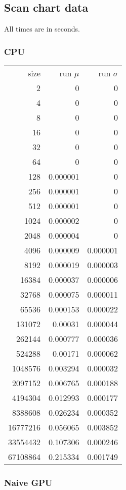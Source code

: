 \subsection{Scan chart data}
\label{sec:scan_chart_data}

All times are in seconds.

\subsubsection{CPU}

\begin{tabular}{r r r}
size & run $\mu$ & run $\sigma$ \\
2 & 0 & 0 \\
4 & 0 & 0 \\
8 & 0 & 0 \\
16 & 0 & 0 \\
32 & 0 & 0 \\
64 & 0 & 0 \\
128 & 0.000001 & 0 \\
256 & 0.000001 & 0 \\
512 & 0.000001 & 0 \\
1024 & 0.000002 & 0 \\
2048 & 0.000004 & 0 \\
4096 & 0.000009 & 0.000001 \\
8192 & 0.000019 & 0.000003 \\
16384 & 0.000037 & 0.000006 \\
32768 & 0.000075 & 0.000011 \\
65536 & 0.000153 & 0.000022 \\
131072 & 0.00031 & 0.000044 \\
262144 & 0.000777 & 0.000036 \\
524288 & 0.00171 & 0.000062 \\
1048576 & 0.003294 & 0.000032 \\
2097152 & 0.006765 & 0.000188 \\
4194304 & 0.012993 & 0.000177 \\
8388608 & 0.026234 & 0.000352 \\
16777216 & 0.056065 & 0.003852 \\
33554432 & 0.107306 & 0.000246 \\
67108864 & 0.215334 & 0.001749 \\
\end{tabular}

\subsubsection{Naive GPU}

